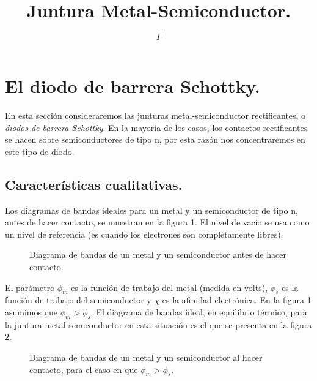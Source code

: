 \documentclass[12pt,a4paper]{article}
\begin{document}
\title{Juntura Metal-Semiconductor.}

\author{$\Gamma$}

\maketitle

\section{El diodo de barrera Schottky.}

En esta sección consideraremos las junturas metal-semiconductor rectificantes, o \emph{diodos de barrera Schottky}. En la mayoría de los casos, los contactos rectificantes se hacen sobre semiconductores de tipo n, por esta razón nos concentraremos en este tipo de diodo.

\subsection{Características cualitativas.}

Los diagramas de bandas ideales para un metal y un semiconductor de tipo n, antes de hacer contacto, se muestran en la figura 1. El nivel de vacío se usa como un nivel de referencia (es cuando los electrones son completamente libres).

\begin{figure}[ht!]
\begin{center}
\caption{Diagrama de bandas de un metal y un semiconductor antes de hacer contacto.}
\end{center}
\end{figure}

El parámetro $\phi _{m}$ es la función de trabajo del metal (medida en volts), $\phi _{s}$ es la función de trabajo del semiconductor y $\chi$ es la afinidad electrónica. En la figura 1 asumimos que $\phi _{m}>\phi _{s}$. El diagrama de bandas ideal, en equilibrio térmico, para la juntura metal-semiconductor en esta situación es el que se presenta en la figura 2.

\begin{figure}[ht!]
\begin{center}
\caption{Diagrama de bandas de un metal y un semiconductor al hacer contacto, para el caso en que $\phi _{m}>\phi _{s}$.}
\end{center}
\end{figure}
\end{document}
